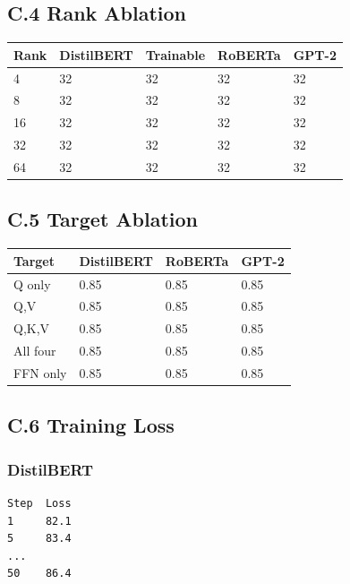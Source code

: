 \subsection{C.4 Rank Ablation}

\begin{table}[H]
\centering
\small
\begin{tabular}{lllll}
\toprule
\textbf{Rank} & \textbf{DistilBERT} & \textbf{Trainable} & \textbf{RoBERTa} & \textbf{GPT-2} \\
\midrule
4 & 32 & 32 & 32 & 32 \\
8 & 32 & 32 & 32 & 32 \\
16 & 32 & 32 & 32 & 32 \\
32 & 32 & 32 & 32 & 32 \\
64 & 32 & 32 & 32 & 32 \\
\bottomrule
\end{tabular}
\end{table}

\subsection{C.5 Target Ablation}

\begin{table}[H]
\centering
\small
\begin{tabular}{llll}
\toprule
\textbf{Target} & \textbf{DistilBERT} & \textbf{RoBERTa} & \textbf{GPT-2} \\
\midrule
Q only & 0.85 & 0.85 & 0.85 \\
Q,V & 0.85 & 0.85 & 0.85 \\
Q,K,V & 0.85 & 0.85 & 0.85 \\
All four & 0.85 & 0.85 & 0.85 \\
FFN only & 0.85 & 0.85 & 0.85 \\
\bottomrule
\end{tabular}
\end{table}

\subsection{C.6 Training Loss}

\subsubsection{DistilBERT}
\begin{lstlisting}
Step  Loss
1     82.1
5     83.4
...
50    86.4
\end{lstlisting}

